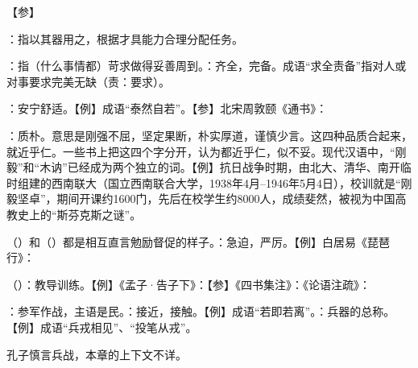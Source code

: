 {
【参】
}
{}


{
\item {}：指以其器用之，根据才具能力合理分配任务。
\item {}：指（什么事情都）苛求做得妥善周到。：齐全，完备。成语“求全责备”指对人或对事要求完美无缺（责：要求）。
}
{}


{
\item {}：安宁舒适。【例】成语“泰然自若”。【参】北宋周敦颐《通书》：
}
{}  %


{
\item {}：质朴。意思是刚强不屈，坚定果断，朴实厚道，谨慎少言。这四种品质合起来，就近乎仁。一些书上把这四个字分开，认为都近乎仁，似不妥。现代汉语中，“刚毅”和“木讷”已经成为两个独立的词。【例】抗日战争时期，由北大、清华、南开临时组建的西南联大（国立西南联合大学，1938年4月--1946年5月4日），校训就是“刚毅坚卓”，期间开课约1600门，先后在校学生约8000人，成绩斐然，被视为中国高教史上的“斯芬克斯之谜”。%
}
{}


{
\item {}（）和（）都是相互直言勉励督促的样子。：急迫，严厉。【例】白居易《琵琶行》：
}
{}


{
\item {}（）：教导训练。【例】《孟子·告子下》：【参】《四书集注》：《论语注疏》：
\item {}：参军作战，主语是民。：接近，接触。【例】成语“若即若离”。：兵器的总称。【例】成语“兵戎相见”、“投笔从戎”。

孔子慎言兵战，本章的上下文不详。%
}
{}



